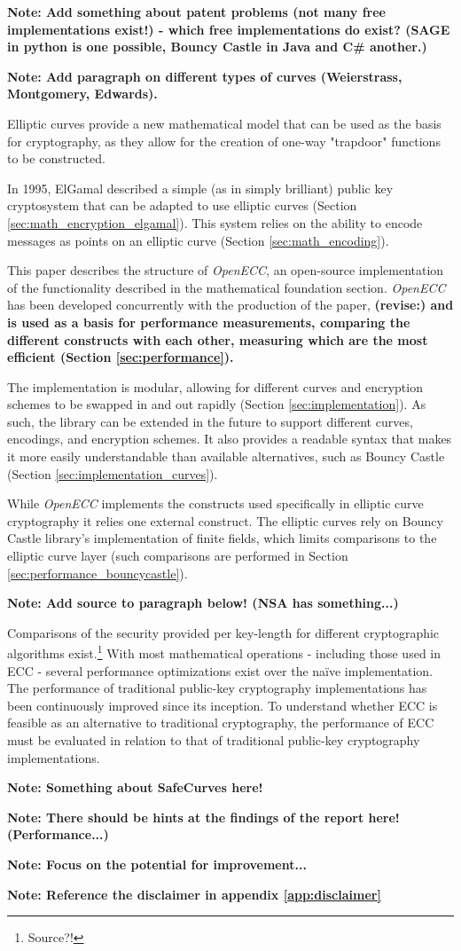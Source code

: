 \textbf{Note: Add something about patent problems (not many free implementations exist!) - which free
implementations do exist? (SAGE in python is one possible, Bouncy Castle in Java and C\# another.)}

\textbf{Note: Add paragraph on different types of curves (Weierstrass, Montgomery, Edwards).}

Elliptic curves provide a new mathematical model that can be used as the basis for cryptography,
as they allow for the creation of one-way "trapdoor" functions to be constructed.

In 1995, ElGamal described a simple (as in simply brilliant) public key cryptosystem that can be adapted
to use elliptic curves (Section \ref{sec:math_encryption_elgamal}). This system relies on the ability to
encode messages as points on an elliptic curve (Section \ref{sec:math_encoding}).

This paper describes the structure of \emph{OpenECC}, an open-source implementation of the functionality
described in the mathematical foundation section. \emph{OpenECC} has been developed concurrently with the
production of the paper, \textbf{(revise:) and is used as a basis for performance measurements, comparing the different constructs
with each other, measuring which are the most efficient (Section \ref{sec:performance}).}

The implementation is modular, allowing for different curves and encryption schemes to be swapped in and out
rapidly (Section \ref{sec:implementation}). As such, the library can be extended in the future to support different
curves, encodings, and encryption schemes. It also provides a readable syntax that makes it more easily
understandable than available alternatives, such as Bouncy Castle (Section \ref{sec:implementation_curves}).

While \emph{OpenECC} implements the constructs used specifically in elliptic curve cryptography it relies one external construct.
The elliptic curves rely on Bouncy Castle library's implementation of finite fields, which limits comparisons to the elliptic curve
layer (such comparisons are performed in Section \ref{sec:performance_bouncycastle}).

\textbf{Note: Add source to paragraph below! (NSA has something...)}

Comparisons of the security provided per key-length for different cryptographic algorithms exist.\footnote{Source?!} With
most mathematical operations - including those used in ECC - several performance optimizations exist over the naïve
implementation. The performance of traditional public-key cryptography implementations has been continuously improved
since its inception. To understand whether ECC is feasible as an alternative to traditional cryptography, the performance
of ECC must be evaluated in relation to that of traditional public-key cryptography implementations.

\textbf{Note: Something about SafeCurves here!}

\textbf{Note: There should be hints at the findings of the report here! (Performance...)}

\textbf{Note: Focus on the potential for improvement...}

\textbf{Note: Reference the disclaimer in appendix \ref{app:disclaimer}}